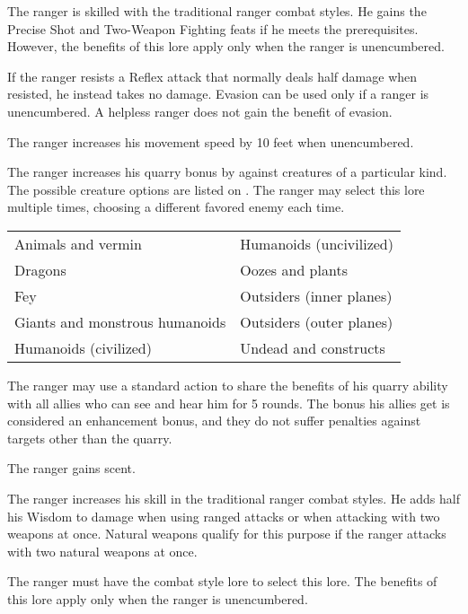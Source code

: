  The ranger is skilled with the traditional ranger combat styles. He gains the Precise Shot and Two-Weapon Fighting feats if he meets the prerequisites. However, the benefits of this lore apply only when the ranger is unencumbered.

 If the ranger resists a Reflex attack that normally deals half damage when resisted, he instead takes no damage. Evasion can be used only if a ranger is unencumbered. A helpless ranger does not gain the benefit of evasion.

 The ranger increases his movement speed by 10 feet when unencumbered.

 The ranger increases his quarry bonus by  against creatures of a particular kind. The possible creature options are listed on . The ranger may select this lore multiple times, choosing a different favored enemy each time.

\begin{dtable}
\begin{tabularx}{\columnwidth}{X X}
Animals and vermin & Humanoids (uncivilized) \\
Dragons & Oozes and plants \\
Fey & Outsiders (inner planes) \\
Giants and monstrous humanoids & Outsiders (outer planes) \\
Humanoids (civilized)  & Undead and constructs \\
\end{tabularx}
\end{dtable}

 The ranger may use a standard action to share the benefits of his quarry ability with all allies who can see and hear him for 5 rounds. The bonus his allies get is considered an enhancement bonus, and they do not suffer penalties against targets other than the quarry.

 The ranger gains scent. 

 The ranger increases his skill in the traditional ranger combat styles. He adds half his Wisdom to damage when using ranged attacks or when attacking with two weapons at once. Natural weapons qualify for this purpose if the ranger attacks with two natural weapons at once.

The ranger must have the combat style lore to select this lore. The benefits of this lore apply only when the ranger is unencumbered.

